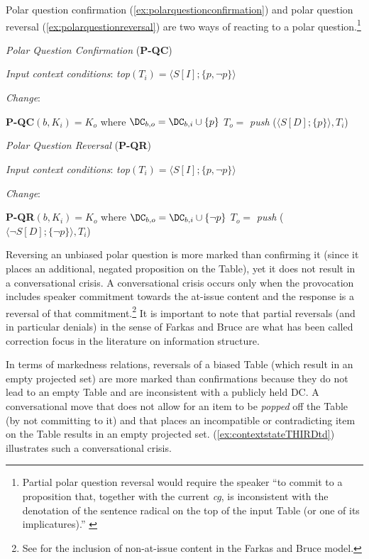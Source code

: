Polar question confirmation (\ref{ex:polarquestionconfirmation}) and polar question reversal (\ref{ex:polarquestionreversal}) are two ways of reacting to a polar question.\footnote{Partial polar question reversal would require the speaker ``to commit to a proposition that, together with the current \textit{cg}, is inconsistent with the denotation of the sentence radical on the top of the input Table (or one of its implicatures).'' \citep[105]{FarkasBruce.2010}} 

\begin{exe}
\ex\label{ex:polarquestionconfirmation} \textit{Polar Question Confirmation} (\textbf{P-QC}) 
	\begin{xlist}
		\ex \textit{Input context conditions}:
		\textit{top}$(T_i)=\langle S [I];\{ p,\neg p \}\rangle$
		
		\ex \textit{Change}: 
		\begin{xlist}
			\ex \textbf{P-QC}$(b,K_i)=K_o$ where $\DC_{b,o}=\DC_{b,i}\cup \{ p \}$ 
			\ex $T_o=$ \textit{push} ($\langle S [D];\{ p \}\rangle, T_i$) 
		\end{xlist}
	\end{xlist}
\ex\label{ex:polarquestionreversal} \textit{Polar Question Reversal} (\textbf{P-QR}) 
	\begin{xlist}
		\ex \textit{Input context conditions}:
		\textit{top}$(T_i)=\langle S [I];\{ p,\neg p \}\rangle$
		
		\ex \textit{Change}: 
		\begin{xlist}
			\ex \textbf{P-QR}$(b,K_i)=K_o$ where $\DC_{b,o}=\DC_{b,i}\cup \{\neg p \}$ 
			\ex $T_o=$ \textit{push} ($\langle \neg S [D];\{\neg p \}\rangle, T_i$) 
		\end{xlist}
	\end{xlist}
\end{exe}

Reversing an unbiased polar question is more marked than confirming it (since it places an additional, negated proposition on the Table), yet it does not result in a conversational crisis. A conversational crisis occurs only when the provocation includes speaker commitment towards the at-issue content and the response is a reversal of that commitment.\footnote{See  for the inclusion of non-at-issue content in the Farkas and Bruce model.} It is important to note that partial reversals (and in particular denials) in the sense of Farkas and Bruce are what has been called correction focus in the literature on information structure.

In terms of markedness relations, reversals of a biased Table (which result in an empty projected set) are more marked than confirmations because they do not lead to an empty Table and are inconsistent with a publicly held DC. A conversational move that does not allow for an item to be \textit{popped} off the Table (by not committing to it) and that places an incompatible or contradicting item on the Table results in an empty projected set. (\ref{ex:contextstateTHIRDtd}) illustrates such a conversational crisis.

